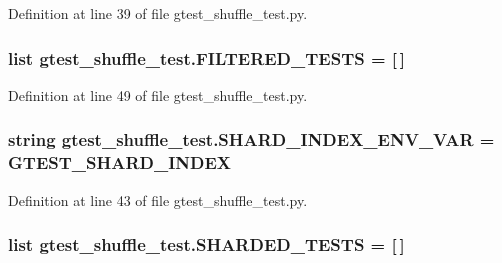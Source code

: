 Definition at line 39 of file gtest\+\_\+shuffle\+\_\+test.\+py.

\subsubsection[{\texorpdfstring{F\+I\+L\+T\+E\+R\+E\+D\+\_\+\+T\+E\+S\+TS}{FILTERED_TESTS}}]{\setlength{\rightskip}{0pt plus 5cm}list gtest\+\_\+shuffle\+\_\+test.\+F\+I\+L\+T\+E\+R\+E\+D\+\_\+\+T\+E\+S\+TS = \mbox{[}$\,$\mbox{]}}\hypertarget{namespacegtest__shuffle__test_a35011532d6bd14ac29c891111ce1a911}{}\label{namespacegtest__shuffle__test_a35011532d6bd14ac29c891111ce1a911}


Definition at line 49 of file gtest\+\_\+shuffle\+\_\+test.\+py.

\subsubsection[{\texorpdfstring{S\+H\+A\+R\+D\+\_\+\+I\+N\+D\+E\+X\+\_\+\+E\+N\+V\+\_\+\+V\+AR}{SHARD_INDEX_ENV_VAR}}]{\setlength{\rightskip}{0pt plus 5cm}string gtest\+\_\+shuffle\+\_\+test.\+S\+H\+A\+R\+D\+\_\+\+I\+N\+D\+E\+X\+\_\+\+E\+N\+V\+\_\+\+V\+AR = \textquotesingle{}G\+T\+E\+S\+T\+\_\+\+S\+H\+A\+R\+D\+\_\+\+I\+N\+D\+EX\textquotesingle{}}\hypertarget{namespacegtest__shuffle__test_ab3215c444f0e35ae2764f862194fe743}{}\label{namespacegtest__shuffle__test_ab3215c444f0e35ae2764f862194fe743}


Definition at line 43 of file gtest\+\_\+shuffle\+\_\+test.\+py.

\subsubsection[{\texorpdfstring{S\+H\+A\+R\+D\+E\+D\+\_\+\+T\+E\+S\+TS}{SHARDED_TESTS}}]{\setlength{\rightskip}{0pt plus 5cm}list gtest\+\_\+shuffle\+\_\+test.\+S\+H\+A\+R\+D\+E\+D\+\_\+\+T\+E\+S\+TS = \mbox{[}$\,$\mbox{]}}\hypertarget{namespacegtest__shuffle__test_ad9bd126c3dc9894a3977a907e97e71e8}{}\label{namespacegtest__shuffle__test_ad9bd126c3dc9894a3977a907e97e71e8}


